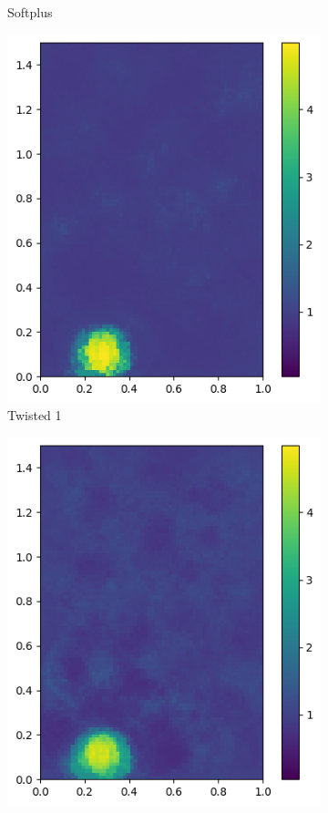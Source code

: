 \documentclass[12pt]{article}
\newcommand{\nhghaloesheight}{3.2cm}
\newcommand{\nhghaloeswidth}{2.6cm}
\begin{document}
\begin{figure}[h]
\begin{subfigure}[c]{\nhghaloeswidth}
    \caption{\label{fig:haloes_softplus} Softplus}
  \end{subfigure}    
  \begin{subfigure}[c]{\nhghaloeswidth}    
    \includegraphics[totalheight=\nhghaloesheight]{Figures/softplus_halos/ex1/mutanhshift0.png}
    \caption{\label{fig:haloes_tanh0} Twisted 1}    
  \end{subfigure}   
  \begin{subfigure}[c]{\nhghaloeswidth}
    \includegraphics[totalheight=\nhghaloesheight]{Figures/softplus_halos/ex1/mutanhshiftp25.png}

\end{subfigure}
\end{figure}
\end{document}
